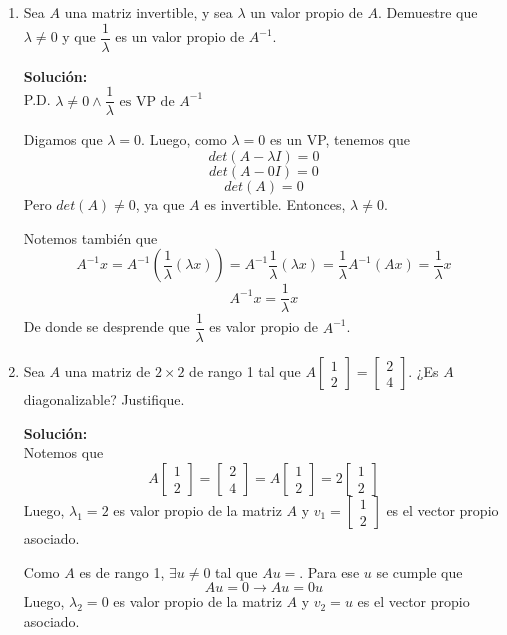 \documentclass[12pt]{article}
\newenvironment{solucion}
{\begin{mdframed}[backgroundcolor=black!10]
		{\bf Solución:}\\
	}
	{
	\end{mdframed}
}
\newenvironment{preguntas}
{\begin{enumerate}\itemsep12pt
	}
	{
	\end{enumerate}
}
\newcommand{\ra}{\rightarrow}
\begin{document}
\begin{preguntas}
\item Sea $A$ una matriz invertible, y sea $\lambda$ un valor propio de $A$. Demuestre que $\lambda \neq 0$ y que $\dfrac{1}{\lambda}$ es un valor propio de $A^{-1}$.
\begin{solucion}

		P.D. $\lambda \neq 0 \wedge \dfrac{1}{\lambda} \text{ es VP de }A^{-1}$
		
		Digamos que $\lambda = 0$. Luego, como $\lambda = 0$ es un VP, tenemos que
		$$det(A-\lambda I) = 0$$
		$$det(A-0 I) = 0$$
		$$det(A) = 0$$
		Pero $det(A) \neq 0$, ya que $A$ es invertible. Entonces, $\lambda \neq 0$.
		
		Notemos también que
		$$A^{-1}x 
		= A^{-1}\left(\dfrac{1}{\lambda}(\lambda x)\right)
		= A^{-1}\dfrac{1}{\lambda}(\lambda x)
		= \dfrac{1}{\lambda}A^{-1}(A x)
		= \dfrac{1}{\lambda} x$$
		$$A^{-1}x 
		= \dfrac{1}{\lambda} x$$
		De donde se desprende que $\dfrac{1}{\lambda}$ es valor propio de $A^{-1}$.
\end{solucion}
\item Sea $A$ una matriz de $2\times 2$ de rango 1 tal que $A\begin{bmatrix} 1 \\ 2\end{bmatrix} = \begin{bmatrix} 2 \\ 4 \end{bmatrix}$. ¿Es $A$ diagonalizable? Justifique.
\begin{solucion}
Notemos que
		$$A\begin{bmatrix} 1 \\ 2\end{bmatrix} = \begin{bmatrix} 2 \\ 4 \end{bmatrix}
		= A\begin{bmatrix} 1 \\ 2\end{bmatrix} = 2\begin{bmatrix} 1 \\ 2 \end{bmatrix}$$
		Luego, $\lambda_1 = 2$ es valor propio de la matriz $A$ y $v_1 = \begin{bmatrix} 1 \\ 2\end{bmatrix}$ es el vector propio asociado.
		
		Como $A$ es de rango 1, $\exists u \neq 0$ tal que $Au = $. Para ese $u$ se cumple que
		$$Au = 0 \ra Au = 0 u$$
		Luego, $\lambda_2 = 0$ es valor propio de la matriz $A$ y $v_2 = u$ es el vector propio asociado.
		

\end{solucion}
\end{preguntas}
\end{document}
